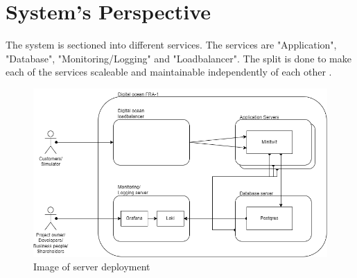 \section{System's Perspective}







The system is sectioned into different services. The services are "Application", "Database", "Monitoring/Logging" and "Loadbalancer". The split is done to make each of the services scaleable and maintainable independently of each other \cite{docs_Deployment}.

\begin{figure}[!ht]
    \centering
    \captionsetup{justification=centering,margin=1cm}
    \includegraphics[width=150mm]{images/diagrams/Overview.png}
    \caption{Image of server deployment}
    \label{fig:ServerDeployment}
\end{figure}

